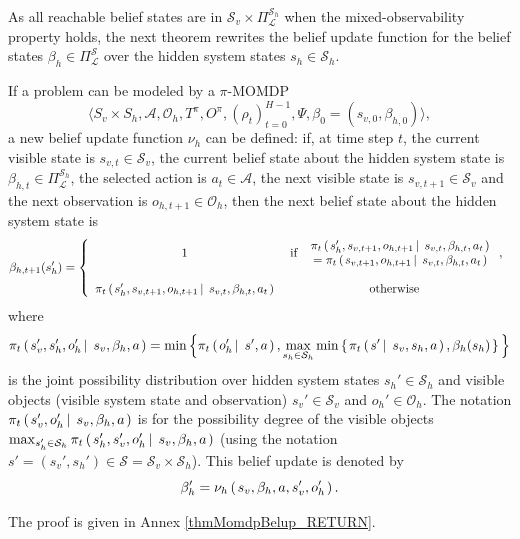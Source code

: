 As all reachable belief states are in $\mathcal{S}_v \times \Pi^{\mathcal{S}_h}_{\mathcal{L}}$
when the mixed-observability property holds, 
the next theorem rewrites the belief update function for the belief states 
$\beta_h \in \Pi^{\mathcal{S}}_{\mathcal{L}}$ over the hidden system states $s_h \in \mathcal{S}_h$.
\begin{theorem}
\label{thmMomdpBelup}
If a problem can be modeled by a $\pi$-MOMDP  
\[ \Big\langle S_v \times S_h, \mathcal{A}, \mathcal{O}_h, T^{\pi}, O^{\pi}, (\rho_t)_{t=0}^{H-1}, \Psi, \beta_0 = (s_{v,0}, \beta_{h,0})  \Big\rangle, \]
a new belief update function $\nu_h$ can be defined:
if, at time step $t$, 
the current visible state is $s_{v,t} \in \mathcal{S}_v$,
the current belief state about the hidden system state is $\beta_{h,t} \in \Pi^{\mathcal{S}_h}_{\mathcal{L}}$,
the selected action is $a_t \in \mathcal{A}$,
the next visible state is $s_{v,t+1} \in \mathcal{S}_v$
and the next observation is $o_{h,t+1} \in \mathcal{O}_h$,
then the next belief state about the hidden system state is
\begin{equation}
\label{equation_piMOMDPupdate}
\beta_{h,t+1}(s_h') = \left \{ \begin{array}{ccc}
1 & \mbox{ if } \left. \begin{array}{cc} \pi_t \left( \left.  s_h', s_{v,t+1}, o_{h,t+1} \, \right| \left. \, s_{v,t}, \beta_{h,t}, a_t  \right. \right) \\
	 	= \pi_t \left( \left. s_{v,t+1}, o_{h,t+1} \, \right| \left. \, s_{v,t}, \beta_{h,t}, a_t  \right. \right)
		\end{array} \right., \\
\\
\pi_t \left( \left.  s_h', s_{v,t+1}, o_{h,t+1} \, \right| \left. \, s_{v,t}, \beta_{h,t}, a_t  \right. \right) & \mbox{ otherwise } 
\end{array} \right. 
\end{equation}
where 
\[ \pi_t \left( \left. s_v',  s_h', o_h' \, \right| \left. \, s_v, \beta_h, a  \right. \right) = \min \Big\{ \pi_t \left( \left.  o_h' \, \right| \left. \, s', a   \right. \right), \max_{s_h \in \mathcal{S}_h} \min \left\{ \left.  \pi_t \left( \left. s' \, \right| \left. \, s_v,s_h, a \right. \right), \beta_h(s_h)   \right. \right\} \Big\} \] 
is the joint possibility distribution over hidden system states $s_h' \in \mathcal{S}_h$ 
and visible objects (visible system state and observation) $s_v' \in \mathcal{S}_v$ and $o_h' \in \mathcal{O}_h$.
The notation $\pi_t \left( \left.  s_v', o_h' \, \right| \left. \, s_v, \beta_h, a  \right. \right)$ 
is for the possibility degree of the visible objects
$\max_{s_h' \in \mathcal{S}_h} \pi_t \left( \left.  s_h', s_v', o_h' \, \right| \left. \, s_v, \beta_h, a  \right. \right)$
(using the notation $s' = (s_v', s_h') \in \mathcal{S} = \mathcal{S}_v \times \mathcal{S}_h$). 
This belief update is denoted by \[ \beta_h' = \nu_h \left( \left.  s_v, \beta_h, a, s_v', o_h'  \right. \right). \]
\end{theorem}
The proof is given in Annex \ref{thmMomdpBelup_RETURN}.

